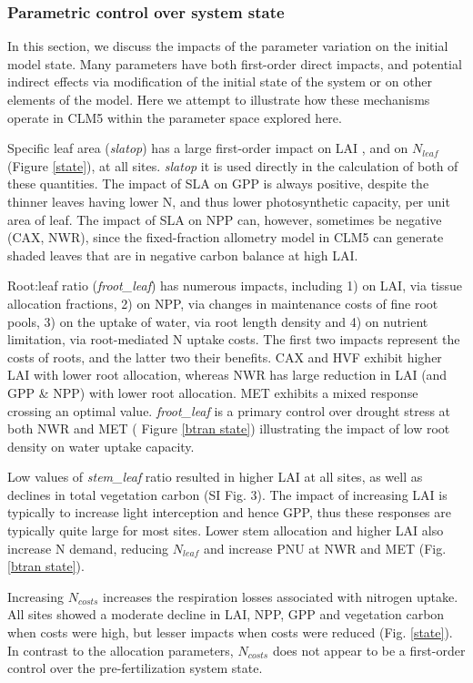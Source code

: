 \documentclass[draft,linenumbers]{agujournal}
\begin{document}
\subsubsection{Parametric control over system state}
In this section, we discuss the impacts of the parameter variation on the initial model state.  Many parameters have both first-order direct impacts, and potential indirect effects via modification of the initial state of the system or on other elements of the model. Here we attempt to illustrate how these mechanisms operate in CLM5 within the parameter space explored here. 

Specific leaf area (\emph{slatop}) has a large first-order impact on LAI , and on $N_{leaf}$ (Figure \ref{state}), at all sites. \emph{slatop} it is used directly in the calculation of both of these quantities. The impact of SLA on GPP is always positive, despite the thinner leaves having lower N, and thus lower photosynthetic capacity, per unit area of leaf. The impact of SLA on NPP can, however, sometimes be negative (CAX, NWR), since the fixed-fraction allometry model in CLM5 can generate shaded leaves that are in negative carbon balance at high LAI. 

Root:leaf ratio (\emph{froot\_leaf}) has numerous impacts, including 1) on LAI, via tissue allocation fractions, 2) on NPP, via changes in maintenance costs of fine root pools, 3) on the uptake of water, via root length density and 4) on nutrient limitation, via root-mediated N uptake costs. The first two impacts represent the costs of roots, and the latter two their benefits. CAX and HVF exhibit higher LAI with lower root allocation, whereas NWR has large reduction in LAI (and GPP \& NPP) with lower root allocation. MET exhibits a mixed response crossing an optimal value. \emph{froot\_leaf} is a primary control over drought stress at both NWR and MET ( Figure \ref{btran state}) illustrating the impact of low root density on water uptake capacity. 

Low values of \emph{stem\_leaf} ratio resulted in higher LAI at all sites, as well as declines in total vegetation carbon (SI Fig. 3).   The impact of increasing LAI is typically to increase light interception and hence GPP, thus these responses are typically quite large for most sites. Lower stem allocation and higher LAI also increase N demand, reducing $N_{leaf}$ and increase PNU at NWR and MET (Fig. \ref{btran state}). 

Increasing $N_{costs}$ increases the respiration losses associated with nitrogen uptake.  All sites showed a moderate decline in LAI, NPP, GPP and vegetation carbon when costs were high, but lesser impacts when costs were reduced (Fig. \ref{state}). In contrast to the allocation parameters, $N_{costs}$ does not appear to be a first-order control over the pre-fertilization system state. 
\end{document}
